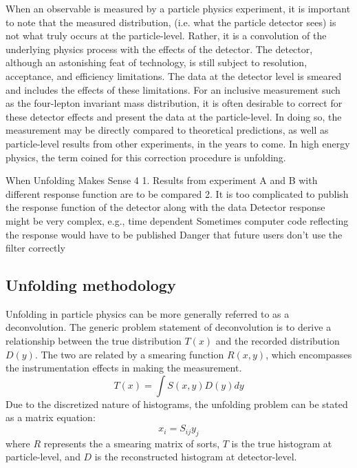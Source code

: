 When an observable is measured by a particle physics experiment, it is important to note that the measured distribution, (i.e. what the particle detector sees) is not what truly occurs at the particle-level. Rather, it is a convolution of the underlying physics process with the effects of the detector. The \ATLAS detector, although an astonishing feat of technology, is still subject to resolution, acceptance, and efficiency limitations. The data at the detector level is smeared and includes the effects of these limitations. For an inclusive measurement such as the four-lepton invariant mass distribution, it is often desirable to correct for these detector effects and present the data at the particle-level. In doing so, the measurement may be directly compared to theoretical predictions, as well as particle-level results from other experiments, in the years to come. In high energy physics, the term coined for this correction procedure is unfolding.

When Unfolding Makes Sense
4
1. Results from experiment A and B with different response function are to be
compared
2. It is too complicated to publish the response function of the detector along
with the data
Detector response might be very complex, e.g., time dependent
Sometimes computer code reflecting the response would have to be published
Danger that future users don't use the filter correctly

\subsection{Unfolding methodology}
\label{subsec:unfmethod}

Unfolding in particle physics can be more generally referred to as a deconvolution. The generic problem statement of deconvolution is to derive a relationship between the true distribution $T(x)$ and the recorded distribution $D(y)$. The two are related by a smearing function $R(x,y)$, which encompasses the instrumentation effects in making the measurement. 
\begin{equation} \label{eq:unfintegral}
    T(x)=\int S(x,y)D(y)dy
\end{equation}
Due to the discretized nature of histograms, the unfolding problem can be stated as a matrix equation:
\begin{equation} \label{eq:unfmatrix}
    x_i=S_{ij}y_j
\end{equation}
where $R$ represents the a smearing matrix of sorts, $T$ is the true histogram at particle-level, and $D$ is the reconstructed histogram at detector-level. 

